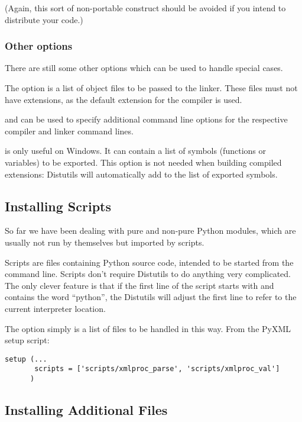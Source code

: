 \documentclass{howto}
\begin{document}
(Again, this sort of non-portable construct should be avoided if you
intend to distribute your code.)


\subsubsection{Other options}

There are still some other options which can be used to handle special
cases.

The  option is a list of object files to be passed
to the linker. These files must not have extensions, as the default
extension for the compiler is used.

 and  can be used
to specify additional command line options for the respective compiler and
linker command lines.

 is only useful on Windows.  It can contain a list
of symbols (functions or variables) to be exported. This option
is not needed when building compiled extensions: Distutils 
will automatically add 
to the list of exported symbols.

\subsection{Installing Scripts}
So far we have been dealing with pure and non-pure Python modules,
which are usually not run by themselves but imported by scripts.

Scripts are files containing Python source code, intended to be
started from the command line.  Scripts don't require Distutils to do
anything very complicated.  The only clever feature is that if the
first line of the script starts with \code{\#!} and contains the word
``python'', the Distutils will adjust the first line to refer to the
current interpreter location.

The  option simply is a list of files to be handled
in this way.  From the PyXML setup script:

\begin{verbatim}
setup (... 
       scripts = ['scripts/xmlproc_parse', 'scripts/xmlproc_val']
      )
\end{verbatim}


\subsection{Installing Additional Files}
\end{document}
